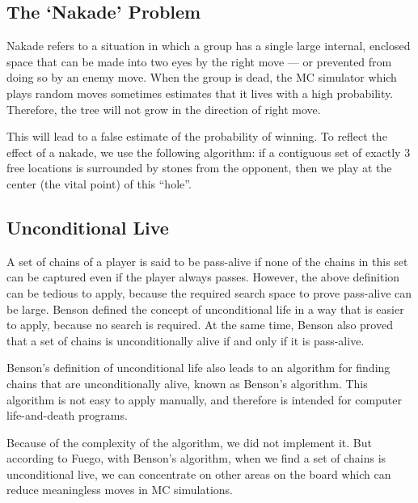 \subsection{The `Nakade' Problem}

Nakade refers to a situation in which a group has a single large internal, enclosed space that can be made into two eyes by the right move --- or prevented from doing so by an enemy move. When the group is dead, the MC simulator which plays random moves sometimes estimates that it lives with a high probability. Therefore, the tree will not grow in the direction of right move. 

This will lead to a false estimate of the probability of winning. To reflect the effect of a nakade, we use the following algorithm\cite{chaslot_combiningexpert}: if a contiguous set of exactly 3 free locations is surrounded by stones from the opponent, then we play at the center (the vital point) of this ``hole''.

\subsection{Unconditional Live}

A set of chains of a player is said to be pass-alive if none of the chains in this set can be captured even if the player always passes. However, the above definition can be tedious to apply, because the required search space to prove pass-alive can be large. Benson\cite{benson1976life} defined the concept of unconditional life in a way that is easier to apply, because no search is required. At the same time, Benson also proved that a set of chains is unconditionally alive if and only if it is pass-alive.

Benson's definition of unconditional life also leads to an algorithm for finding chains that are unconditionally alive, known as Benson's algorithm. This algorithm is not easy to apply manually, and therefore is intended for computer life-and-death programs.

Because of the complexity of the algorithm, we did not implement it. But according to Fuego\cite{enzenberger2010fuego}, with Benson's algorithm, when we find a set of chains is unconditional live, we can concentrate on other areas on the board which can reduce meaningless moves in MC simulations. 